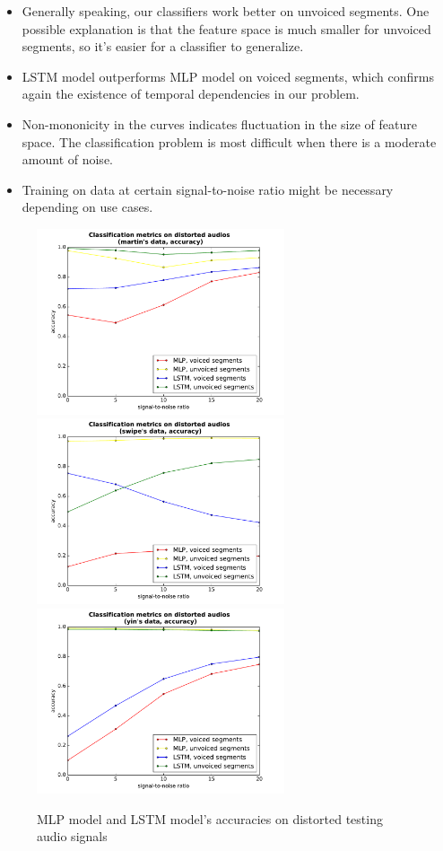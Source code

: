 \documentclass[11pt,a4paper]{report}
\begin{document}
\begin{itemize}
  \item Generally speaking, our classifiers work better on unvoiced segments. One possible explanation is that the feature space is much smaller for unvoiced segments, so it's easier for a classifier to generalize.
  \item LSTM model outperforms MLP model on voiced segments, which confirms again the existence of temporal dependencies in our problem.
  \item Non-mononicity in the curves indicates fluctuation in the size of feature space. The classification problem is most difficult when there is a moderate amount of noise.
  \item Training on data at certain signal-to-noise ratio might be necessary depending on use cases.
\end{itemize}

\begin{figure}[htbp]
  \centering
  \includegraphics[width=0.65\textwidth]{classification_metrics_martin_accuracy.pdf}
  \includegraphics[width=0.65\textwidth]{classification_metrics_swipe_accuracy.pdf}
  \includegraphics[width=0.65\textwidth]{classification_metrics_yin_accuracy.pdf}
  \caption{MLP model and LSTM model's accuracies on distorted testing audio signals}
  \label{fig:distorted-testing-data-accuracy}
\end{figure}
\end{document}
